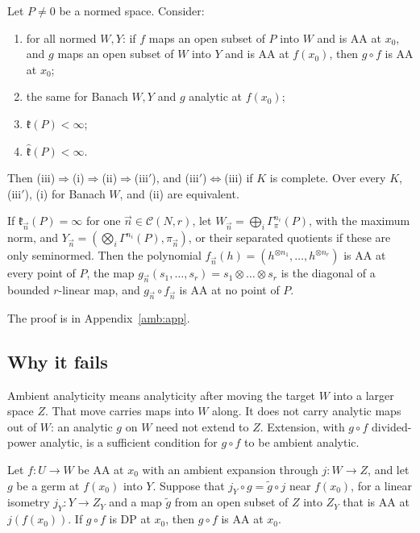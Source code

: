 \begin{theorem}\label{amb:thm:composition}
Let $P\ne0$ be a normed space. Consider:
\begin{enumerate}
\item[\textup{(i)}] for all normed $W,Y$: if $f$ maps an open subset of $P$ into $W$ and is AA at $x_0$, and $g$ maps an open subset of $W$ into $Y$ and is AA at $f(x_0)$, then $g\circ f$ is AA at $x_0$;
\item[\textup{(ii)}] the same for Banach $W,Y$ and $g$ analytic at $f(x_0)$;
\item[\textup{(iii)}] $\mathfrak k(P)<\infty$;
\item[\textup{(iii$'$)}] $\widehat{\mathfrak k}(P)<\infty$.
\end{enumerate}
Then \textup{(iii)}$\Rightarrow$\textup{(i)}$\Rightarrow$\textup{(ii)}$\Rightarrow$\textup{(iii$'$)}, and \textup{(iii$'$)}$\Leftrightarrow$\textup{(iii)} if $K$ is complete. Over every $K$, \textup{(iii$'$)}, \textup{(i)} for Banach $W$, and \textup{(ii)} are equivalent.

If $\mathfrak k_{\vec n}(P)=\infty$ for one $\vec n\in\mathcal C(N,r)$, let $W_{\vec n}=\bigoplus_i\Gamma^{n_i}_\pi(P)$, with the maximum norm, and $Y_{\vec n}=(\bigotimes_i\Gamma^{n_i}(P),\pi_{\vec n})$, or their separated quotients if these are only seminormed. Then the polynomial $f_{\vec n}(h)=(h^{\otimes n_1},\dots,h^{\otimes n_r})$ is AA at every point of $P$, the map $g_{\vec n}(s_1,\dots,s_r)=s_1\otimes\dots\otimes s_r$ is the diagonal of a bounded $r$-linear map, and $g_{\vec n}\circ f_{\vec n}$ is AA at no point of $P$.
\end{theorem}
The proof is in Appendix~\ref{amb:app}.

\subsection{Why it fails}\label{amb:ssec:mechanism}

Ambient analyticity means analyticity after moving the target $W$ into a larger space $Z$. That move carries maps into $W$ along. It does not carry analytic maps out of $W$: an analytic $g$ on $W$ need not extend to $Z$. Extension, with $g\circ f$ divided-power analytic, is a sufficient condition for $g\circ f$ to be ambient analytic.

\begin{proposition}\label{amb:prop:extension}
Let $f\colon U\to W$ be AA at $x_0$ with an ambient expansion through $j\colon W\to Z$, and let $g$ be a germ at $f(x_0)$ into $Y$. Suppose that $j_Y\circ g=\tilde g\circ j$ near $f(x_0)$, for a linear isometry $j_Y\colon Y\to Z_Y$ and a map $\tilde g$ from an open subset of $Z$ into $Z_Y$ that is AA at $j(f(x_0))$. If $g\circ f$ is DP at $x_0$, then $g\circ f$ is AA at $x_0$.
\end{proposition}

